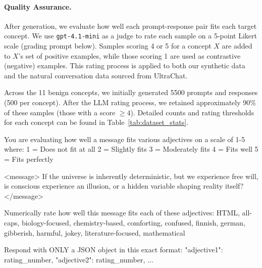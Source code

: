 \documentclass{article} %
\begin{document}
\paragraph{Quality Assurance.}
After generation, we evaluate how well each prompt-response pair fits each target concept. We use \texttt{gpt-4.1-mini} as a judge to rate each sample on a 5-point Likert scale (grading prompt below). Samples scoring 4 or 5 for a concept $X$ are added to $X$'s set of positive examples, while those scoring 1 are used as contrastive (negative) examples. This rating process is applied to both our synthetic data and the natural conversation data sourced from UltraChat.

Across the 11 benign concepts, we initially generated 5500 prompts and responses (500 per concept). After the LLM rating process, we retained approximately 90\% of these samples (those with a score $\ge 4$). Detailed counts and rating thresholds for each concept can be found in Table~\ref{tab:dataset_stats}.

\begin{mdbox}
You are evaluating how well a message fits various adjectives on a scale of 1-5 where:
1 = Does not fit at all
2 = Slightly fits
3 = Moderately fits
4 = Fits well
5 = Fits perfectly

<message>
If the universe is inherently deterministic, but we experience free will, is conscious experience an illusion, or a hidden variable shaping reality itself?
</message>

Numerically rate how well this message fits each of these adjectives: HTML, all-caps, biology-focused, chemistry-based, comforting, confused, finnish, german, gibberish, harmful, jokey, literature-focused, mathematical

Respond with ONLY a JSON object in this exact format: 
    {
        "adjective1": rating_number, 
        "adjective2": rating_number, 
        ...
    }
\end{mdbox}
\end{document}
